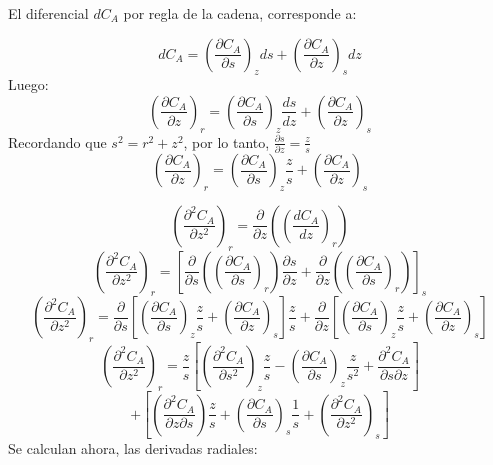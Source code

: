 El diferencial $dC_A$ por regla de la cadena, corresponde a:

\begin{equation*}
    dC_A=(\frac{\partial C_A}{\partial s})_zds+(\frac{\partial C_A}{\partial z})_sdz
\end{equation*}
Luego:
\begin{equation*}
    (\frac{\partial C_A}{\partial z})_r=(\frac{\partial C_A}{\partial s})_z\frac{ds}{dz}+(\frac{\partial C_A}{\partial z})_s
\end{equation*}
Recordando que $s^2=r^2+z^2$, por lo tanto, $\frac{\partial s}{\partial z}=\frac{z}{s}$
\begin{equation*}
    (\frac{\partial C_A}{\partial z})_r=(\frac{\partial C_A}{\partial s})_z\frac{z}{s}+(\frac{\partial C_A}{\partial z})_s
\end{equation*}

\begin{equation*}
    (\frac{\partial^2C_A}{\partial z^2})_r=\frac{\partial}{\partial z}((\frac{dC_A}{dz})_r)
\end{equation*}
\begin{equation*}
    (\frac{\partial^2C_A}{\partial z^2})_r=[\frac{\partial}{\partial s}((\frac{\partial C_A}{\partial s})_r)\frac{\partial s}{\partial z}+\frac{\partial }{\partial z}((\frac{\partial C_A}{\partial s})_r)]_s
\end{equation*}
\begin{equation*}
    (\frac{\partial^2C_A}{\partial z^2})_r=\frac{\partial}{\partial s}[(\frac{\partial C_A}{\partial s})_z\frac{z}{s}+(\frac{\partial C_A}{\partial z})_s]\frac{z}{s}+\frac{\partial }{\partial z}[(\frac{\partial C_A}{\partial s})_z\frac{z}{s}+(\frac{\partial C_A}{\partial z})_s]
\end{equation*}
\begin{equation*}
    (\frac{\partial^2C_A}{\partial z^2})_r=\frac{z}{s}[(\frac{\partial^2 C_A}{\partial s^2})_z\frac{z}{s}-(\frac{\partial C_A}{\partial s})_z\frac{z}{s^2}+\frac{\partial^2C_A}{\partial s \partial z}]
\end{equation*}
\begin{equation*}
    +[(\frac{\partial^2C_A}{\partial z \partial s})\frac{z}{s}+(\frac{\partial C_A}{\partial s})_s\frac{1}{s}+(\frac{\partial^2C_A}{\partial z^2})_s]
\end{equation*}
Se calculan ahora, las derivadas radiales:

